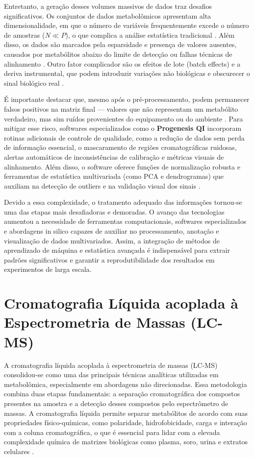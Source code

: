 Entretanto, a geração desses volumes massivos de dados traz desafios significativos. Os conjuntos de dados metabolômicos apresentam alta dimensionalidade, em que o número de variáveis frequentemente excede o número de amostras ($N \ll P$), o que complica a análise estatística tradicional \cite{LILAND2011827,picone2026integrating}. Além disso, os dados são marcados pela esparsidade e presença de valores ausentes, causados por metabólitos abaixo do limite de detecção ou falhas técnicas de alinhamento \cite{li2016performance}. Outro fator complicador são os efeitos de lote (batch effects) e a deriva instrumental, que podem introduzir variações não biológicas e obscurecer o sinal biológico real \cite{li2016performance}.

É importante destacar que, mesmo após o pré-processamento, podem permanecer falsos positivos na matriz final — valores que não representam um metabólito verdadeiro, mas sim ruídos provenientes do equipamento ou do ambiente \cite{schiffman2019filtering}. Para mitigar esse risco, softwares especializados como o \textbf{Progenesis QI} incorporam rotinas adicionais de controle de qualidade, como a redução de dados sem perda de informação essencial, o mascaramento de regiões cromatográficas ruidosas, alertas automáticos de inconsistências de calibração e métricas visuais de alinhamento. Além disso, o software oferece funções de normalização robusta e ferramentas de estatística multivariada (como PCA e dendrogramas) que auxiliam na detecção de outliers e na validação visual dos sinais \cite{watersprogenesisguide}.

Devido a essa complexidade, o tratamento adequado das informações tornou-se uma das etapas mais desafiadoras e demoradas. O avanço das tecnologias aumentou a necessidade de ferramentas computacionais, softwares especializados e abordagens in silico capazes de auxiliar no processamento, anotação e visualização de dados multivariados. Assim, a integração de métodos de aprendizado de máquina e estatística avançada é indispensável para extrair padrões significativos e garantir a reprodutibilidade dos resultados em experimentos de larga escala.


\section{\textbf{Cromatografia Líquida acoplada à Espectrometria de Massas (LC-MS)}}

A cromatografia líquida acoplada à espectrometria de massas (LC-MS) consolidou-se como uma das principais técnicas analíticas utilizadas em metabolômica, especialmente em abordagens não direcionadas. Essa metodologia combina duas etapas fundamentais: a separação cromatográfica dos compostos presentes na amostra e a detecção desses compostos pelo espectrômetro de massas. A cromatografia líquida permite separar metabólitos de acordo com suas propriedades físico-químicas, como polaridade, hidrofobicidade, carga e interação com a coluna cromatográfica, o que é essencial para lidar com a elevada complexidade química de matrizes biológicas como plasma, soro, urina e extratos celulares \cite{chen2022guide}.

